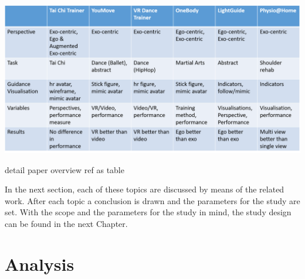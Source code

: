 \begin{table}
	\centering
	\includegraphics[width=1.0\textwidth]{img/detail_paper_overview.png}
	\caption{detail paper overview \todo ref as table}
	\label{tbl:detailOverviewTable}
\end{table}
In the next section, each of these topics are discussed by means of the related work. After each topic a conclusion is drawn and the parameters for the study are set. With the scope and the parameters for the study in mind, the study design can be found in the next Chapter.


\section{Analysis}
